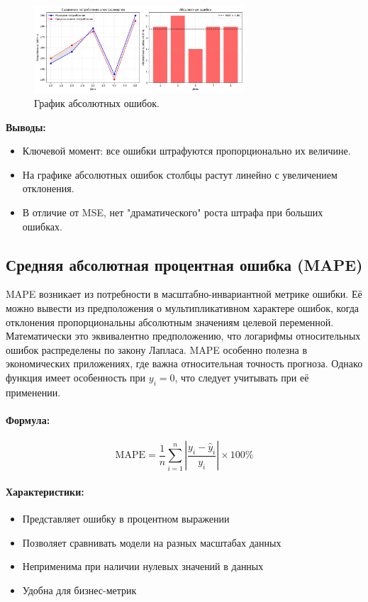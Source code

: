 \documentclass[12pt]{article}
\theoremstyle{definition}
\theoremstyle{definition}
\theoremstyle{definition}
\theoremstyle{remark}
\theoremstyle{remark}
\begin{document}
\begin{figure}[h!]
    \centering
    \includegraphics[width=0.7\textwidth]{imgs/mae.png}
    \caption{График абсолютных ошибок.}
    \label{fig:mae_graph}
\end{figure}

\noindent\textbf{Выводы:}
\begin{itemize}
    \item Ключевой момент: все ошибки штрафуются пропорционально их величине.
    \item На графике абсолютных ошибок столбцы растут линейно с увеличением отклонения.
    \item В отличие от MSE, нет "драматического" роста штрафа при больших ошибках.
\end{itemize}


    

\subsection{Средняя абсолютная процентная ошибка (MAPE)}

MAPE возникает из потребности в масштабно-инвариантной метрике ошибки. Её можно вывести из предположения о мультипликативном характере ошибок, когда отклонения пропорциональны абсолютным значениям целевой переменной. Математически это эквивалентно предположению, что логарифмы относительных ошибок распределены по закону Лапласа. MAPE особенно полезна в экономических приложениях, где важна относительная точность прогноза. Однако функция имеет особенность при $y_i = 0$, что следует учитывать при её применении.

\paragraph{Формула:}
\[
\text{MAPE} = \frac{1}{n} \sum_{i=1}^{n} \left|\frac{y_i - \hat{y}_i}{y_i}\right| \times 100\%
\]

\paragraph{Характеристики:}
\begin{itemize}
    \item Представляет ошибку в процентном выражении
    \item Позволяет сравнивать модели на разных масштабах данных
    \item Неприменима при наличии нулевых значений в данных
    \item Удобна для бизнес-метрик
\end{itemize}
\end{document}
